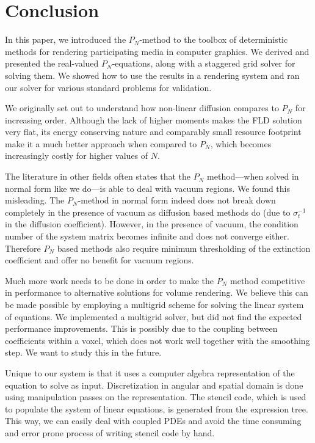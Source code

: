 \section{Conclusion}
\label{sec:conclusion}

In this paper, we introduced the $P_N$-method to the toolbox of deterministic methods for rendering participating media in computer graphics. We derived and presented the real-valued $P_N$-equations, along with a staggered grid solver for solving them. We showed how to use the results in a rendering system and ran our solver for various standard problems for validation.

We originally set out to understand how non-linear diffusion compares to $P_N$ for increasing order. Although the lack of higher moments makes the FLD solution very flat, its energy conserving nature and comparably small resource footprint make it a much better approach when compared to $P_N$, which becomes increasingly costly for higher values of $N$.

\vspace{0.5in}

The literature in other fields often states that the $P_N$ method---when solved in normal form like we do---is able to deal with vacuum regions. We found this misleading. The $P_N$-method in normal form indeed does not break down completely in the presence of vacuum as diffusion based methods do (due to $\sigma_t^{-1}$ in the diffusion coefficient). However, in the presence of vacuum, the condition number of the system matrix becomes infinite and does not converge either. Therefore $P_N$ based methods also require minimum thresholding of the extinction coefficient and offer no benefit for vacuum regions.

Much more work needs to be done in order to make the $P_N$ method competitive in performance to alternative solutions for volume rendering. We believe this can be made possible by employing a multigrid scheme for solving the linear system of equations. We implemented a multigrid solver, but did not find the expected performance improvements. This is possibly due to the coupling between coefficients within a voxel, which does not work well together with the smoothing step. We want to study this in the future.

Unique to our system is that it uses a computer algebra representation of the equation to solve as input. Discretization in angular and spatial domain is done using manipulation passes on the representation. The stencil code, which is used to populate the system of linear equations, is generated from the expression tree. This way, we can easily deal with coupled PDEs and avoid the time consuming and error prone process of writing stencil code by hand.

